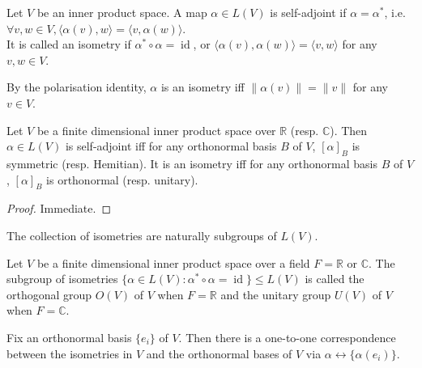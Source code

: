 \begin{definition}
    Let $V$ be an inner product space.
    A map $\alpha\in L(V)$ is self-adjoint if $\alpha=\alpha^\ast$, i.e. $\forall v,w\in V,\langle\alpha(v),w\rangle=\langle v,\alpha(w)\rangle$.\\
    It is called an isometry if $\alpha^\ast\circ\alpha=\operatorname{id}$, or $\langle\alpha(v),\alpha(w)\rangle=\langle v,w\rangle$ for any $v,w\in V$.
\end{definition}
\begin{remark}
    By the polarisation identity, $\alpha$ is an isometry iff $\|\alpha(v)\|=\|v\|$ for any $v\in V$.
\end{remark}
\begin{lemma}
    Let $V$ be a finite dimensional inner product space over $\mathbb R$ (resp. $\mathbb C$).
    Then $\alpha\in L(V)$ is self-adjoint iff for any orthonormal basis $B$ of $V$, $[\alpha]_B$ is symmetric (resp. Hemitian).
    It is an isometry iff for any orthonormal basis $B$ of $V$, $[\alpha]_B$ is orthonormal (resp. unitary).
\end{lemma}
\begin{proof}
    Immediate.
\end{proof}
The collection of isometries are naturally subgroups of $L(V)$.
\begin{definition}
    Let $V$ be a finite dimensional inner product space over a field $F=\mathbb R$ or $\mathbb C$.
    The subgroup of isometries $\{\alpha\in L(V):\alpha^\ast\circ\alpha=\operatorname{id}\}\le L(V)$ is called the orthogonal group $O(V)$ of $V$ when $F=\mathbb R$ and the unitary group $U(V)$ of $V$ when $F=\mathbb C$.
\end{definition}
\begin{remark}
    Fix an orthonormal basis $\{e_i\}$ of $V$.
    Then there is a one-to-one correspondence between the isometries in $V$ and the orthonormal bases of $V$ via $\alpha\leftrightarrow \{\alpha(e_i)\}$.
\end{remark}